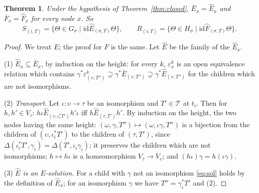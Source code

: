 \documentclass[11pt]{amsart}
\newtheorem{thm}{Theorem}[section]
\theoremstyle{definition}
\newcommand{\id}{\mathrm{id}}
\begin{document}
\begin{thm}\label{thm:rec}
Under the hypothesis of Theorem~\ref{thm:closed}, $\bar E_x=\widehat
E_x$ and $\bar F_x=\widehat F_x$ for every node $x$. So
\[
S_{(i,T)}=\{\Theta\in G_\sigma\mid\id\mathrel{\widehat E_{(\sigma,T)}}
\Theta\},\qquad R_{(i,T)}=\{\Theta\in H_\sigma\mid\id\mathrel{
\widehat F_{(\sigma,T)}}\Theta\}.
\]
\end{thm}
\begin{proof}
We treat $E$; the proof for $F$ is the same. Let $\widehat E$ be the
family of the $\widehat E_x$.

(1) \emph{$\widehat E_x\subseteq\bar E_x$}, by induction on the
height: for every $k$, $\varepsilon^k_x$ is an open equivalence
relation which contains $\gamma^*\varepsilon^k_{(\upsilon,T'')}
\supseteq\gamma^*\bar E_{(\upsilon,T'')}\supseteq\gamma^*\widehat
E_{(\upsilon,T'')}$ for the children which are not isomorphisms.

(2) \emph{Transport.} Let $\iota\colon\upsilon\to\tau$ be an
isomorphism and $T'\in\mathcal T$ at $t_i$. Then for $h,h'\in
V_\tau$: $h\iota\mathrel{\widehat E_{(\upsilon,\iota_i^*T')}}h'\iota$
iff $h\mathrel{\widehat E_{(\tau,T')}}h'$. By induction on the
height, the two nodes having the same height: $(\omega,\gamma,T'')
\mapsto(\omega,\iota\gamma,T'')$ is a bijection from the children of
$(\upsilon,\iota_i^*T')$ to the children of $(\tau,T')$, since
$\Delta(\iota_i^*T',\gamma_i)=\Delta(T',\iota_i\gamma_i)$; it
preserves the children which are not isomorphisms; $h\mapsto h\iota$
is a homeomorphism $V_\tau\to V_\upsilon$; and
$(h\iota)\gamma=h(\iota\gamma)$.

(3) \emph{$\widehat E$ is an $E$-solution.} For a child with $\gamma$
not an isomorphism \eqref{eq:sol} holds by the definition of
$\widehat E_x$; for an isomorphism $\gamma$ we have
$T''=\gamma_i^*T'$ and (2).


\end{proof}
\end{document}
